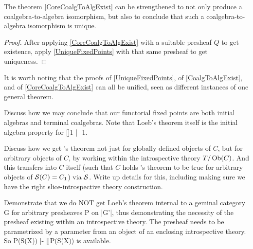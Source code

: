 \begin{theorem}
The theorem \cref{CoreCoalgToAlgExist} can be strengthened to not only produce a coalgebra-to-algebra isomorphism, but also to conclude that such a coalgebra-to-algebra isomorphism is unique.
\end{theorem}
\begin{proof}
After applying \cref{CoreCoalgToAlgExist} with a suitable presheaf $Q$ to get existence, apply \cref{UniqueFixedPoints} with that same presheaf to get uniqueness.
\end{proof}

It is worth noting that the proofs of \cref{UniqueFixedPoints}, of \cref{CoalgToAlgExist}, and of \cref{CoreCoalgToAlgExist} can all be unified, seen as different instances of one general theorem. 

\begin{TODOblock}
Discuss how we may conclude that our functorial fixed points are both initial algebras and terminal coalgebras. Note that Loeb's theorem itself is the initial algebra property for []1 |- 1.
\end{TODOblock}

\begin{TODOblock}
Discuss how we get \Loeb's theorem not just for globally defined objects of $C$, but for arbitrary objects of $C$, by working within the introspective theory $T/\operatorname{Ob}(C)$. And this transfers into $C$ itself (such that $C$ holds \Loeb's theorem to be true for arbitrary objects of $\mathcal{S}(C) = C_1$) via $\mathcal{S}$. Write up details for this, including making sure we have the right slice-introspective theory construction.
\end{TODOblock}

\begin{TODOblock}
Demonstrate that we do NOT get Loeb's theorem internal to a geminal category G for arbitrary presheaves P on |G'|, thus demonstrating the necessity of the presheaf existing within an introspective theory. The presheaf needs to be parametrized by a parameter from an object of an enclosing introspective theory. So P(S(X)) |- []P(S(X)) is available.
\end{TODOblock}